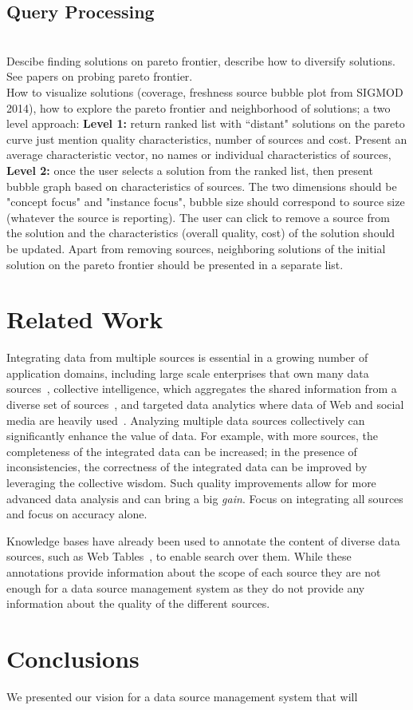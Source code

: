 \documentclass{sig-alternate}
\begin{document}
\subsection{Query Processing}

\ \\Descibe finding solutions on pareto frontier, describe how to diversify solutions. See papers on probing pareto frontier. 
\ \\How to visualize solutions (coverage, freshness source bubble plot from SIGMOD 2014), how to explore the pareto frontier and neighborhood of solutions; a two level approach: {\bf Level 1:} return ranked list with ``distant" solutions on the pareto curve just mention quality characteristics, number of sources and cost. Present an average characteristic vector, no names or individual characteristics of sources, {\bf Level 2:} once the user selects a solution from the ranked list, then present bubble graph based on characteristics of sources. The two dimensions should be "concept focus" and "instance focus", bubble size should correspond to source size (whatever the source is reporting). The user can click to remove a source from the solution and the characteristics (overall quality, cost) of the solution should be updated. Apart from removing sources, neighboring solutions of the initial solution on the pareto frontier should be presented in a separate list. 

\section{Related Work}
\label{sec:related}
Integrating data from multiple sources is essential in a growing number of application domains, including large scale enterprises that own many data sources~\cite{halevy:2006}, collective intelligence, which aggregates the shared information from a diverse set of sources~\cite{hua:2013,qi:2013}, and targeted data analytics where data of Web and social media are heavily used~\cite{jin:2013}. Analyzing multiple data sources collectively can significantly enhance the value of data. For example, with more sources, the completeness of the integrated data can be increased; in the presence of inconsistencies, the correctness of the integrated data can be improved by leveraging the collective wisdom. Such quality improvements allow for more advanced data analysis and can bring a big {\em gain}. Focus on integrating all sources and focus on accuracy alone.

Knowledge bases have already been used to annotate the content of diverse data sources, such as Web Tables~\cite{limaye:2010, dassarma:2012, fan:2014}, to enable search over them. While these annotations provide information about the scope of each source they are not enough for a data source management system as they do not provide any information about the quality of the different sources.


\section{Conclusions}
\label{sec:conclusion}
We presented our vision for a data source management system that will 



\end{document}
